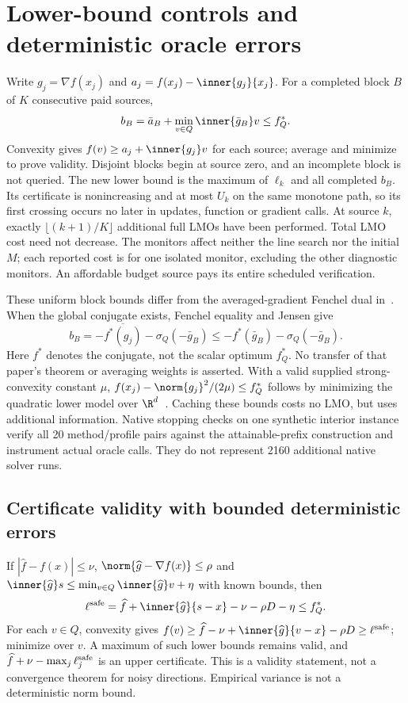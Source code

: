 \section{Lower-bound controls and deterministic oracle errors}
\label{app:monitors}
Write $g_j=\nabla f(x_j)$ and $a_j=f(x_j)-\inner{g_j}{x_j}$.
For a completed block $B$ of $K$ consecutive paid sources,
\[
 b_B=\bar a_B+\min_{v\in Q}\inner{\bar g_B}v\le f_Q^*.
\]
Convexity gives $f(v)\ge a_j+\inner{g_j}v$ for each source;
average and minimize to prove validity. Disjoint blocks begin at
source zero, and an incomplete block is not queried. The new lower
bound is the maximum of $\ell_k$ and all completed $b_B$.
Its certificate is nonincreasing and at most $U_k$ on the same
monotone path, so its first crossing occurs no later in updates,
function or gradient calls. At source $k$, exactly
$\lfloor(k+1)/K\rfloor$ additional full LMOs have been performed.
Total LMO cost need not decrease. The monitors affect neither the
line search nor the initial $M$; each reported cost is for one
isolated monitor, excluding the other diagnostic monitors.
An affordable budget source pays its entire scheduled verification.

These uniform block bounds differ from the averaged-gradient Fenchel
dual in~\cite[Theorem 3]{pedregosa}. When the global conjugate exists,
Fenchel equality and Jensen give
\[
 b_B=-\overline{f^*(g_j)}-\sigma_Q(-\bar g_B)
     \le-f^*(\bar g_B)-\sigma_Q(-\bar g_B).
\]
Here $f^*$ denotes the conjugate, not the scalar optimum $f_Q^*$.
No transfer of that paper's theorem or averaging weights is asserted.
With a valid supplied strong-convexity constant $\mu$,
$f(x_j)-\norm{g_j}^2/(2\mu)\le f_Q^*$ follows by minimizing the
quadratic lower model over $\R^d$~\cite[Appendix B]{karimi}.
Caching these bounds costs no LMO, but uses additional information.
Native stopping checks on one synthetic interior instance verify all
20 method/profile pairs against the attainable-prefix construction
and instrument actual oracle calls. They do not represent 2160
additional native solver runs.

\subsection{Certificate validity with bounded deterministic errors}
\label{app:inexact}
If $|\widehat f-f(x)|\le\nu$,
$\norm{\widehat g-\nabla f(x)}\le\rho$ and
$\inner{\widehat g}s\le\min_{v\in Q}\inner{\widehat g}v+\eta$
with known bounds, then
\[
 \ell^{\rm safe}=\widehat f+\inner{\widehat g}{s-x}
                      -\nu-\rho D-\eta\le f_Q^*.
\]
For each $v\in Q$, convexity gives
$f(v)\ge\widehat f-\nu+\inner{\widehat g}{v-x}-\rho D
\ge\ell^{\rm safe}$; minimize over $v$.
A maximum of such lower bounds remains valid, and
$\widehat f+\nu-\max_j\ell_j^{\rm safe}$ is an upper certificate.
This is a validity statement, not a convergence theorem for noisy
directions. Empirical variance is not a deterministic norm bound.

